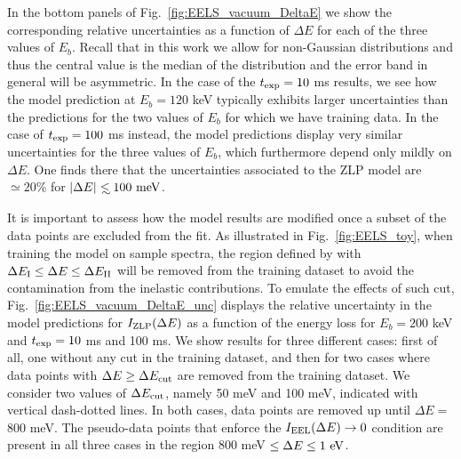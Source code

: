 In the bottom panels of Fig.~\ref{fig:EELS_vacuum_DeltaE} we show
the corresponding relative uncertainties as a function of $\Delta E$
for each of the three values of $E_b$.
%
Recall that in this work we allow for non-Gaussian distributions and thus the central
value is the median of the distribution and the error band in general will
be asymmetric.
%
In the case of the $t_{\rm exp}=10$ ms results, we see how the model prediction
at $E_b=120$ keV typically exhibits larger uncertainties than the predictions
for the two values of $E_b$ for which we have training data.
%
In the case of $t_{\rm exp}=100$ ms instead, the model predictions display very similar
uncertainties for the three values of $E_b$, which furthermore depend only mildly on $\Delta E$.
%
One finds there that the uncertainties associated to the ZLP model are $\simeq 20\%$
for $|\Delta E| \lsim 100~{\rm meV}$.



It is important to assess how the model results are modified once a subset of the data points
are excluded from the fit.
%
As illustrated in Fig.~\ref{fig:EELS_toy}, when training the model on sample spectra, the
region defined by
with $\Delta E_{\rm I} \le \Delta E \le \Delta E_{\rm II}$ will be removed from the training dataset to avoid the
contamination from the inelastic contributions.
%
To emulate the effects of such cut, 
Fig.~\ref{fig:EELS_vacuum_DeltaE_unc} displays
the relative uncertainty in the model predictions for $I_{\rm ZLP}(\Delta E)$
as a function of the energy loss for $E_b=200$ keV and $t_{\rm exp}=10$ ms 
and 100 ms.
%
We show results for three different cases: first of all, one without any cut
in the training dataset, and then for two cases where data points with $\Delta E \ge \Delta E_{\rm cut}$
are removed from the training dataset.
%
We consider two values of $\Delta E_{\rm cut}$, namely 50 meV and 100 meV, indicated
with vertical dash-dotted lines.
%
In both cases, data points are removed up until $\Delta E =$ 800 meV. The pseudo-data points 
that enforce the $I_{\rm EEL}(\Delta E)\to 0$ condition are present
in all three cases in the region 800 meV $\le \Delta E \le 1~{\rm eV}$. 

